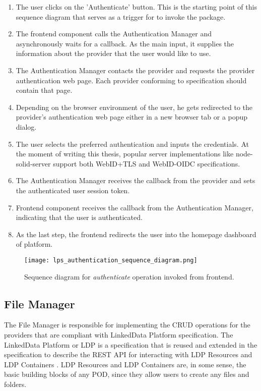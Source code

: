 \begin{enumerate}
    \item The user clicks on the 'Authenticate' button. This is the starting point of this sequence diagram that serves as a trigger for \lpa{} to invoke the \lpa{} package.
    \item The frontend component calls the Authentication Manager and asynchronously waits for a callback. As the main input, it supplies the information about the \solid{} provider that the user would like to use.
    \item The Authentication Manager contacts the \solid{} provider and requests the provider authentication web page. Each provider conforming to \solid{} specification should contain that page.
    \item Depending on the browser environment of the user, he gets redirected to the provider's authentication web page either in a new browser tab or a popup dialog.
    \item The user selects the preferred authentication and inputs the credentials. At the moment of writing this thesis, popular \solid{} server implementations like node-solid-server support both WebID+TLS and WebID-OIDC specifications.
    \item The Authentication Manager receives the callback from the provider and sets the authenticated user session token.
    \item Frontend component receives the callback from the Authentication Manager, indicating that the user is authenticated.
    \item As the last step, the frontend redirects the user into the homepage dashboard of \lpa{} platform.
\end{enumerate}


\begin{figure}[h]
\centering
\texttt{[image: lps\_authentication\_sequence\_diagram.png]}
\caption{Sequence diagram for \textit{authenticate} operation invoked from \lpa{} frontend.}
\label{fig:lps_authentication_sequence_diagram}
\end{figure}


\subsection{File Manager}
\label{sssec:file_manager}
The File Manager is responsible for implementing the CRUD operations for the \solid{}  providers that are compliant with LinkedData Platform specification. The LinkedData Platform or LDP is a specification that is reused and extended in the \solid{} specification to describe the REST API for interacting with LDP Resources and LDP Containers \cite{Speicher:15:LDP}. LDP Resources and LDP Containers are, in some sense, the basic building blocks of any \solid{} POD, since they allow users to create any files and folders. 

